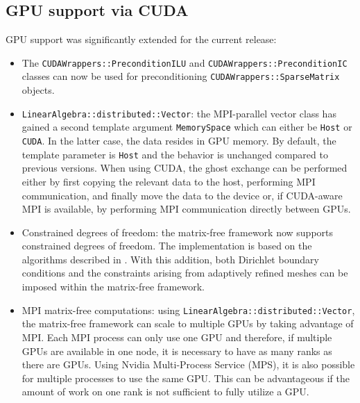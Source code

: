 \documentclass{ansarticle-preprint}
\begin{document}
\subsection{GPU support via CUDA}
\label{subsec:gpu}

GPU support was significantly extended for the current release:
\begin{itemize}
  \item The \texttt{CUDAWrappers::PreconditionILU} and \texttt{CUDAWrappers::PreconditionIC}
    classes can now be used for preconditioning \texttt{CUDAWrappers::SparseMatrix} objects.
  \item \texttt{LinearAlgebra::distributed::Vector}: the MPI-parallel vector
    class has gained a second template argument \texttt{MemorySpace} which can
    either be \texttt{Host} or \texttt{CUDA}. In the latter case, the data
    resides in GPU memory. By default, the template parameter is
    \texttt{Host} and the behavior is unchanged compared to previous versions.
    When using CUDA, the ghost exchange can be performed either by first copying
    the relevant data to the host, performing MPI communication, and finally
    move the data to the device or, if CUDA-aware MPI is available, by
    performing MPI communication directly between GPUs.
  \item Constrained degrees of freedom: the matrix-free framework now
    supports constrained degrees of freedom. The implementation is based on
    the algorithms described in \cite{ljungkvist2017}. With this addition,
    both Dirichlet boundary conditions and the constraints arising from
    adaptively refined meshes can be imposed within the matrix-free
    framework.

  \item MPI matrix-free computations: using \texttt{LinearAlgebra::distributed::Vector}, the
    matrix-free framework can scale to multiple GPUs by taking
    advantage of MPI. Each MPI process can only use one GPU and therefore, if
    multiple GPUs are available in one node, it is necessary to have as many
    ranks as there are GPUs. Using Nvidia Multi-Process Service (MPS), it is also possible
    for multiple processes to use the same GPU. This can be advantageous if the
    amount of work on one rank is not sufficient to fully utilize a GPU.
\end{itemize}
\end{document}
